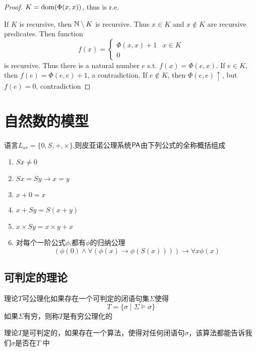 \documentclass[11pt]{article}
\begin{document}
\begin{proof}
\(K=\operatorname{dom}(\Phi(x,x))\), thus is r.e.

If \(K\) is recursive, then \(\mathbb{N}\setminus K\) is recursive. Thus \(x\in K\) and \(x\notin K\) are recursive
predicates. Then function
\begin{equation*}
f(x)=
\begin{cases}
\Phi(x,x)+1&x\in K\\
0
\end{cases}
\end{equation*}
is recursive. Thus there is a natural number \(e\) s.t. \(f(x)=\Phi(e,x)\). If \(e\in K\),
then \(f(e)=\Phi(e,e)+1\), a contradiction. If \(e\notin K\), then \(\Phi(e,e)\uparrow\), but \(f(e)=0\), contradiction
\end{proof}
\section{自然数的模型}
\label{sec:org48014f3}
\begin{definition}[皮亚诺公理系统]
语言\(L_{ar}=\{0,S,+,\times\}\),则皮亚诺公理系统\(\operatorname{\textsf{PA}}\)由下列公式的全称概括组成
\begin{enumerate}
\item \(Sx\neq 0\)
\item \(Sx=Sy\to x=y\)
\item \(x+0=x\)
\item \(x+Sy=S(x+y)\)
\item \(x\times Sy=x\times y+x\)
\item 对每个一阶公式\(\phi\),都有\(\phi\)的归纳公理
\begin{equation*}
(\phi(0)\wedge\forall(\phi(x)\to\phi(S(x))))\to\forall x\phi(x)
\end{equation*}
\end{enumerate}
\end{definition}
\subsection{可判定的理论}
\label{sec:orgdf4f4ba}
\begin{definition}[]
理论\(T\)可公理化如果存在一个可判定的闭语句集\(\Sigma\)使得
\begin{equation*}
T=\{\sigma\mid\Sigma\vDash\sigma\}
\end{equation*}
如果\(\Sigma\)有穷，则称\(T\)是有穷公理化的
\end{definition}

\begin{definition}[]
理论\(T\)是可判定的，如果存在一个算法，使得对任何闭语句\(\sigma\)，该算法都能告诉我们\(\sigma\)是否在\(T\)
中
\end{definition}
\end{document}
